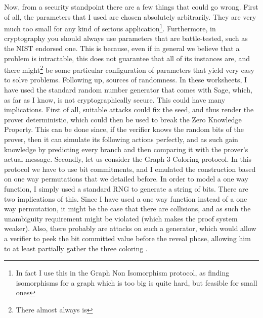 \documentclass{article}
\begin{document}
\par Now, from a security standpoint there are a few things that could go wrong.
First of all, the parameters that I used are chosen absolutely arbitrarily. They are very much too small for any kind
of serious application\footnote{In fact I use this in the Graph Non Isomorphism protocol, as finding isomorphisms for a
    graph which is too big is quite hard, but feasible for small ones}.
Furthermore, in cryptography you should always use parameters that are battle-tested, such as the NIST \cite{barkerRecommendationPairWiseKeyEstablishment2018}
endorsed one. This is because, even if in general we believe that a problem is intractable, this does not guarantee that
all of its instances are, and there might\footnote{There almost always is} be some particular configuration of parameters
that yield very easy to solve problems. Following up, sources of randomness. In these worksheets, I have used the standard
random number generator that comes with Sage, which, as far as I know, is not cryptographically secure. This could have
many implications. First of all, suitable attacks could fix the seed, and thus render the prover deterministic, which could
then be used to break the Zero Knowledge Property. This can be done since, if the verifier knows the random bits of the
prover, then it can simulate its following actions perfectly, and as such gain knowledge by predicting every branch and
then comparing it with the prover's actual message. Secondly, let us consider the Graph 3 Coloring
protocol. In this protocol we have to use bit commitments, and I emulated the construction based on one way permutations
that we detailed before. In order to model a one way function, I simply used a standard RNG to generate a string of bits.
There are two implications of this. Since I have used a one way function instead of a one way permutation,
it might be the case that there are collisions, and as such the unambiguity requirement might be violated (which makes
the proof system weaker). Also, there probably are attacks on such a generator, which would allow a verifier to peek
the bit committed value before the reveal phase, allowing him to at least partially gather the three coloring .



\appendix
\end{document}
